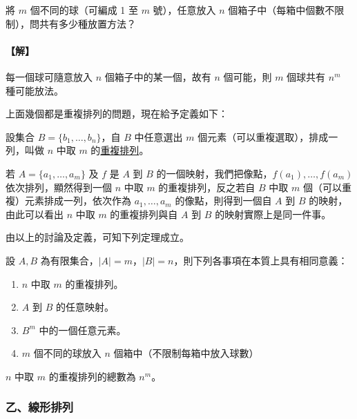 \vspace{1em}
\begin{discussion}\label{disc:b5-2-2}
將 $m$ 個不同的球（可編成 1 至 $m$ 號），任意放入 $n$ 個箱子中（每箱中個數不限制），問共有多少種放置方法？
\end{discussion}
\paragraph{【解】}
每一個球可隨意放入 $n$ 個箱子中的某一個，故有 $n$ 個可能，則 $m$ 個球共有 $n^m$ 種可能放法。

\vspace{0.5em}
上面幾個都是重複排列的問題，現在給予定義如下：

\begin{definition*}
設集合 $B=\{b_1, \dots, b_n\}$，自 $B$ 中任意選出 $m$ 個元素（可以重複選取），排成一列，叫做 $n$ 中取 $m$ 的\underline{重複排列}。
\end{definition*}

若 $A = \{a_1, \dots, a_m\}$ 及 $f$ 是 $A$ 到 $B$ 的一個映射，我們把像點，$f(a_1), \dots, f(a_m)$ 依次排列，顯然得到一個 $n$ 中取 $m$ 的重複排列，反之若自 $B$ 中取 $m$ 個（可以重複）元素排成一列，依次作為 $a_1, \dots, a_m$ 的像點，則得到一個自 $A$ 到 $B$ 的映射，由此可以看出 $n$ 中取 $m$ 的重複排列與自 $A$ 到 $B$ 的映射實際上是同一件事。

由以上的討論及定義，可知下列定理成立。

\begin{theorem}\label{thm:b5-2-4}
設 $A, B$ 為有限集合，$|A|=m$，$|B|=n$，則下列各事項在本質上具有相同意義：
\begin{enumerate}[label=\Roman*., itemsep=2pt, topsep=2pt]
  \item $n$ 中取 $m$ 的重複排列。
  \item $A$ 到 $B$ 的任意映射。
  \item $B^m$ 中的一個任意元素。
  \item $m$ 個不同的球放入 $n$ 個箱中（不限制每箱中放入球數）
\end{enumerate}
\end{theorem}

\begin{corollary*}
$n$ 中取 $m$ 的重複排列的總數為 $n^m$。
\end{corollary*}

\subsubsection*{乙、線形排列}

